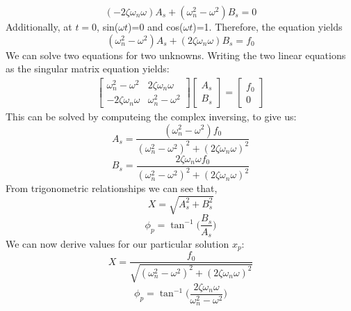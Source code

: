 \documentclass[12pt,letter]{article}
\numberwithin{ex}{section} %
\numberwithin{re}{section} %
\numberwithin{pr}{section} %
\begin{document}
			\begin{equation}
				(-2\zeta \omega_n \omega)A_s + (\omega_n^2 - \omega^2)B_s = 0
			\end{equation}	
			Additionally, at $t=0$, sin($\omega t$)=0 and cos($\omega t$)=1. Therefore, the equation yields		
			\begin{equation}
				(\omega_n^2 - \omega^2)A_s + (2\zeta \omega_n \omega)B_s = f_0
			\end{equation}				
			We can solve two equations for two unknowns. Writing the two linear equations as the singular matrix equation yields:
			\begin{gather}
			   \begin{bmatrix}
			   \omega_n^2 - \omega^2 & 2\zeta \omega_n \omega \\
			   - 2\zeta \omega_n \omega &  \omega_n^2 - \omega^2
			   \end{bmatrix}
  			   \begin{bmatrix}
  			   A_s \\
  			   B_s
  			   \end{bmatrix}
			 = \begin{bmatrix} f_0 \\ 0
			 \end{bmatrix}
			\end{gather}
			This can be solved by computeing the complex inversing, to give us:
			\begin{equation}
				A_s = \frac{(\omega_n^2 - \omega^2)f_0}{(\omega_n^2 - \omega^2)^2 +  (2\zeta \omega_n \omega)^2}
			\end{equation}	
			\begin{equation}
				B_s = \frac{2\zeta \omega_n \omega f_0}{(\omega_n^2 - \omega^2)^2 +  (2\zeta \omega_n \omega)^2}
			\end{equation}	
			From trigonometric relationships we can see that, 
			\begin{equation}
				X = \sqrt{A_s^2 + B_s^2}
			\end{equation}	
			\begin{equation}
				\phi_p = \tan^{-1}\bigg(\frac{B_s}{A_s}\bigg)
			\end{equation}	
			We can now derive values for our particular solution $x_p$:
			\begin{equation}
				X = \frac{f_0}{\sqrt{(\omega_n^2 - \omega^2)^2 +  (2\zeta \omega_n \omega)^2}} 
				\label{eq:X_damped}
			\end{equation}	
			\begin{equation}
				\phi_p = \tan^{-1} \bigg(\frac{2\zeta \omega_n \omega}{\omega_n^2 - \omega^2}\bigg)
			\end{equation}				
\end{document}
